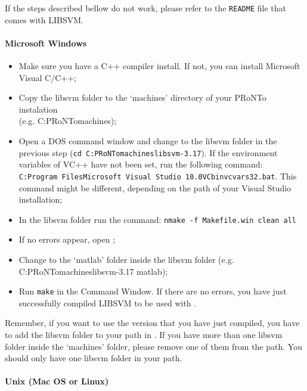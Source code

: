 If the steps described bellow do not work, please refer to the {\tt README} file that comes with LIBSVM.

\paragraph{Microsoft Windows}
\begin{itemize}
    \item Make sure you have a C++ compiler install. If not, you can install Microsoft Visual C/C++;
    \item Copy the libsvm folder to the `machines' directory of your PRoNTo instalation\\(e.g. C:\bslash PRoNTo\bslash machines\bslash);
    \item Open a DOS command window and change to the libsvm folder in the previous step ({\tt cd C:\bslash PRoNTo\bslash machines\bslash libsvm-3.17\bslash}). If the environment variables of VC++ have not been set, run the following command:\\{\tt C:\bslash Program Files\bslash Microsoft Visual Studio 10.0\bslash VC\bslash bin\bslash vcvars32.bat}. This command might be different, depending on the path of your Visual Studio installation;
    \item In the libsvm folder run the command: {\tt nmake -f Makefile.win clean all} 
    \item If no errors appear, open \matlab;
    \item Change to the `matlab' folder inside the libsvm folder (e.g. C:\bslash PRoNTo\bslash machines\bslash libsvm-3.17 \bslash matlab\bslash);
    \item Run {\tt make} in the \matlab{} Command Window. If there are no errors, you have just successfully compiled LIBSVM to be used with \matlab.
\end{itemize}

Remember, if you want to use the version that you have just compiled, you have to add the libsvm folder to your path in \matlab. If you have more than one libsvm folder inside the `machines' folder, please remove one of them from the \matlab{} path. You should only have one libsvm folder in your path.


\paragraph{Unix (Mac OS or Linux)}

